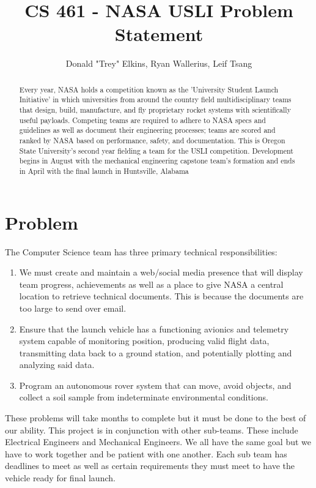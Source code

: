 \documentclass{IEEEtran}  %
\title{\LARGE \bf
CS 461 - NASA USLI Problem Statement
}
\author{Donald "Trey" Elkins, Ryan Wallerius, Leif Tsang
}
\begin{document}
\maketitle
\pagestyle{plain}

\begin{abstract}
        Every year, NASA holds a competition known as the ’University Student Launch Initiative’ in which universities from around
the country field multidisciplinary teams that design, build, manufacture, and fly proprietary rocket systems with scientifically
useful payloads. Competing teams are required to adhere to NASA specs and guidelines as well as document their engineering
processes; teams are scored and ranked by NASA based on performance, safety, and documentation. This is Oregon State
University’s second year fielding a team for the USLI competition. Development begins in August with the mechanical
engineering capstone team’s formation and ends in April with the final launch in Huntsville, Alabama
\end{abstract}


\section{Problem}
\noindent
The Computer Science team has three primary technical responsibilities: 
\begin{enumerate}
    \item We must create and  maintain a web/social media presence that will display team progress, achievements as well as a place to give NASA a central location to retrieve technical documents. This is because the documents are too large to send over email.  
    \item Ensure that the launch vehicle has a functioning  avionics and telemetry system capable of monitoring position, producing valid flight data, transmitting data back to a ground station, and potentially plotting and analyzing said data.
    \item Program an autonomous rover system that can move, avoid objects, and collect a soil sample from indeterminate environmental conditions. 
\end{enumerate}
These problems will take months to complete but it must be done to the best of our ability. This project is in conjunction with other sub-teams. These include Electrical Engineers and Mechanical Engineers. We all have the same goal but we have to work together and be patient with one another. Each sub team has deadlines to meet as well as certain requirements they must meet to have the vehicle ready for final launch.   
\end{document}

